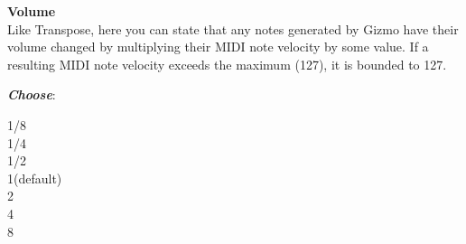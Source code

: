 \documentclass{article}
\begin{document}
\begin{description}
	\item{\bf  Volume}\\
		Like Transpose, here you can state that any notes generated by Gizmo have their volume changed by multiplying their MIDI note velocity by some value.  If a resulting MIDI note velocity exceeds the maximum (127), it is bounded to 127.
			
			
			\begin{description}
			\item{\bf \textit{Choose}}:
			\begin{tabbing}
			1/8\\
			1/4\\
			1/2\hspace{3.65in}\\
			1\qquad (default)\\
			2\\
			4\\
			8
			\end{tabbing}
		\end{description}


\end{description}
\end{document}
